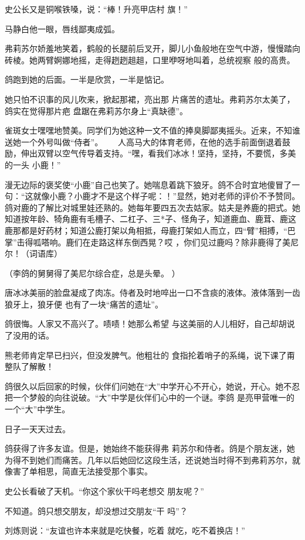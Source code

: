 \documentclass{article}
\begin{document}
史公长又是铜喉铁嗓，说：“棒！升亮甲店村
旗！” 


马静白他一眼，唇线鄙夷成弧。 

弗莉苏尔娇羞地笑着，鹤般的长腿前后叉开，脚儿小鱼般地在空气中游，慢慢踏向砖棱。她两臂婀娜地摇，走得趔趔趄趄，口里咿呀地叫着，总统视察
般的高贵。 

鸽跑到她的后面。一半是欣赏，一半是惦记。

她只怕不识事的风儿吹来，掀起那裙，亮出那
\newpage
片痛苦的遗址。弗莉苏尔太美了，鸽实在觉得那片疤
盘踞在弗莉苏尔身上“真缺德”。 

雀斑女士嘿嘿地赞美。同学们为她这种一文不值的捧臭脚鄙夷摇头。近来，不知谁送她一个外号叫做“侍者”。　　 人高马大的体育老师，在他的选手前面倒退着鼓励，伸出双臂以空气传导着支持。“嘿，看我们冰冰！坚持，坚持，不要慌，多美的一头
小鹿！” 

漫无边际的褒奖使“小鹿”自己也笑了。她喘息着跳下狼牙。鸽不合时宜地傻冒了一句：“这就像小鹿？小鹿才不是这个样子呢：！”显然，她对老师的评价不予赞同。鸽对鹿的了解比对城里娃还熟的。她每年要四五次去姑家。姑夫是养鹿的把式。她知道按年龄、犄角鹿有毛槽子、二杠子、三*子、怪角子，知道鹿血、鹿茸、鹿这鹿那都是好药材；知道公鹿打架以角相抵，母鹿打架如人而立，四“臂”相搏，“巴掌”击得呱嗒响。鹿们在走路这样东倒西晃？哎
，你们见过鹿吗？除非鹿得了美尼尔！（词语库） 

\newpage

（李鸽的舅舅得了美尼尔综合症，总是头晕。
） 

唐冰冰美丽的脸盘凝成了肉冻。侍者及时地啐出一口不含痰的液体。液体落到一齿狼牙上，狼牙便
也有了一块“痛苦的遗址”。 

鸽很悔。人家又不高兴了。啧啧！她那么希望
与这美丽的人儿相好，自己却胡说了没用的话。 

熊老师肯定早已扫兴，但没发脾气。他粗壮的
食指抡着哨子的系绳，说下课了甭整队了解散！ 

鸽很久以后回家的时候，伙伴们问她在“大”中学开心不开心，她说，开心。她不忍把一个梦般的向往说破。“大”中学是伙伴们心中的一个谜。李鸽
是亮甲营唯一的一个“大”中学生。 


日子一天天过去。 

鸽获得了许多友谊。但是，她始终不能获得弗
\newpage
莉苏尔和侍者。鸽是个朋友迷，她为得不到她们而痛苦。几年以后她回忆这段生活，还说她当时得不到弗莉苏尔，就像害了单相思，简直无法接受那个事实。

史公长看破了天机。“你这个家伙干吗老想交
朋友呢？” 

不知道。鸽只想交朋友，却没想过交朋友“干
吗”？ 

刘炼则说：“友谊也许本来就是吃快餐，吃着
就吃，吃不着换店！” 
\end{document}
